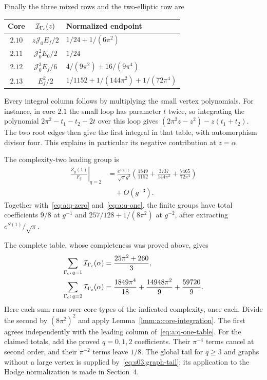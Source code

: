 Finally the three mixed rows and the two-elliptic row are
\begin{center}
\begin{tabular}{ccl}
 Core&$\mathcal I_{\Gamma_{\rm c}}(z)$&Normalized endpoint\\[1mm]\hline
 \noalign{\smallskip}
 $2.10$&$z\mathcal J_0E_f/2$&$1/24+1/(6\pi^2)$\\[1mm]
 $2.11$&$\mathcal J_0^2E_0/2$&$1/24$\\[1mm]
 $2.12$&$\mathcal J_0^3E_f/6$&$4/(9\pi^2)+16/(9\pi^4)$\\[1mm]
 $2.13$&$E_f^2/2$&$1/1152+1/(144\pi^2)+1/(72\pi^4)$
\end{tabular}
\end{center}

Every integral column follows by multiplying the small vertex
polynomials. For instance, in core $2.1$ the small loop has parameter
$t$ twice, so integrating the polynomial
$2\pi^2-t_1-t_2-2t$ over this loop gives
$(2\pi^2z-z^2)-z(t_1+t_2)$. The two root edges then give the first
integral in that table, with automorphism divisor four. This explains
in particular its negative contribution at $z=\alpha$.

\begin{prp}\label{prp:a:finite-summary}
The complexity-two leading group is
\begin{equation}\label{eq:a:q-two}
\begin{aligned}
 \left.\frac{Z_g(1)}{F_g}\right|_{q=2}
 &=\frac{e^{S(1)}}{\sqrt\pi g^2}
 \left(\frac{1849}{1152}+\frac{3737}{144\pi^2}
                             +\frac{7465}{72\pi^4}\right)\\
 &\quad+O(g^{-3}).
\end{aligned}
\end{equation}
Together with~\eqref{eq:a:q-zero} and~\eqref{eq:a:q-one}, the finite
groups have total coefficients $9/8$ at $g^{-1}$ and
$257/128+1/(8\pi^2)$ at $g^{-2}$, after extracting
$e^{S(1)}/\sqrt\pi$.
\end{prp}
\begin{prf}
The complete table, whose completeness was proved above, gives
\begin{align*}
 \sum_{\Gamma_{\rm c}:\,q=1}\mathcal I_{\Gamma_{\rm c}}(\alpha)
                 &=\frac{25\pi^2+260}{3},\\
 \sum_{\Gamma_{\rm c}:\,q=2}\mathcal I_{\Gamma_{\rm c}}(\alpha)
                 &=\frac{1849\pi^4}{18}
                         +\frac{14948\pi^2}{9}+\frac{59720}{9}.
\end{align*}
Here each sum runs over core types of the indicated complexity, once
each. Divide the second by $(8\pi^2)^2$ and apply
Lemma~\ref{lmm:a:core-integration}. The first agrees independently
with the leading column of~\eqref{eq:a:q-one-table}.
For the claimed totals, add the proved $q=0,1,2$ coefficients. Their
$\pi^{-4}$ terms cancel at second order, and their $\pi^{-2}$ terms
leave $1/8$. The global tail for $q\geq3$ and graphs without a large
vertex is supplied by~\eqref{eq:s03:graph-tail}; its application to
the Hodge normalization is made in Section~4.
\end{prf}

